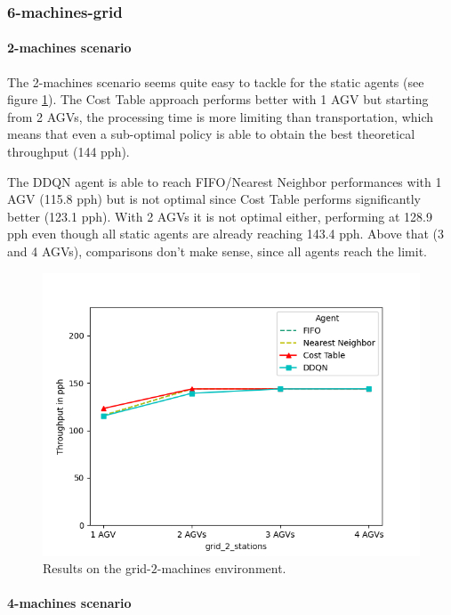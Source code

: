\documentclass[sn-mathphys]{sn-jnl}
\begin{document}
\subsubsection{6-machines-grid}

\paragraph{2-machines scenario}

The 2-machines scenario seems quite easy to tackle for the static agents (see figure \ref{fig:grid_2_machines_results}). The Cost Table approach performs better with 1 AGV but starting from 2 AGVs, the processing time is more limiting than transportation, which means that even a sub-optimal policy is able to obtain the best theoretical throughput (144 pph). 

The DDQN agent is able to reach FIFO/Nearest Neighbor performances with 1 AGV (115.8 pph) but is not optimal since Cost Table performs significantly better (123.1 pph). With 2 AGVs it is not optimal either, performing at 128.9 pph even though all static agents are already reaching 143.4 pph. Above that (3 and 4 AGVs), comparisons don't make sense, since all agents reach the limit.

\begin{figure}[ht]
  \includegraphics[width=1.0\textwidth]{results_grid_2_machines.png}
  \caption{Results on the grid-$2$-machines environment.}
  \label{fig:grid_2_machines_results}
\end{figure}

\paragraph{4-machines scenario}
\end{document}

